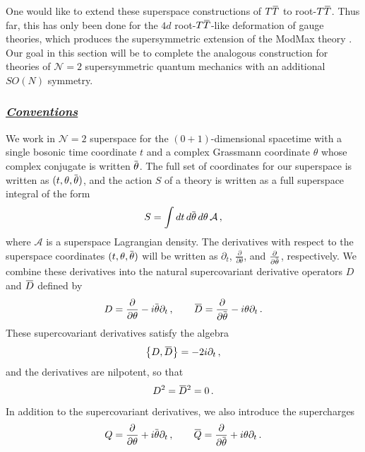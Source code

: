 \documentclass[12pt]{article}
\numberwithin{equation}{section}
\newcommand{\ul}{\underline}
\newcommand{\overbar}[1]{\mkern 1.5mu\overline{\mkern-1.5mu#1\mkern-1.5mu}\mkern 1.5mu}
\newcommand{\Dbar}{\overbar{D}}
\newcommand{\Qbar}{\overbar{Q}}
\newcommand{\thetab}{\overbar{\theta}}
\def\TT{{T\overbar{T}}}
\begin{document}
One would like to extend these superspace constructions of $\TT$ to root-$\TT$. Thus far, this has only been done for the $4d$ root-$\TT$-like deformation of gauge theories, which produces the supersymmetric extension of the ModMax theory \cite{Ferko:2023ruw}. Our goal in this section will be to complete the analogous construction for theories of $\mathcal{N} = 2$ supersymmetric quantum mechanics with an additional $SO(N)$ symmetry.

\subsubsection*{\ul{\it Conventions}}

We work in $\mathcal{N} = 2$ superspace for the $(0+1)$-dimensional spacetime with a single bosonic time coordinate $t$ and a complex Grassmann coordinate $\theta$ whose complex conjugate is written $\overbar{\theta}$. The full set of coordinates for our superspace is written as $(t , \theta , \overbar{\theta} )$, and the action $S$ of a theory is written as a full superspace integral of the form
%
\begin{align}
    S = \int dt \, d \thetab \, d \theta \, \mathcal{A} \, , 
\end{align}
%
where $\mathcal{A}$ is a superspace Lagrangian density. The derivatives with respect to the superspace coordinates $(t, \theta, \overbar{\theta})$ will be written as $\partial_t$, $\frac{\partial}{\partial \theta}$, and $\frac{\partial}{\partial \thetab}$, respectively. We combine these derivatives into the natural supercovariant derivative operators $D$ and $\Dbar$ defined by
%
\begin{align}
    D = \frac{\partial}{\partial \theta} - i \thetab \partial_t \, , \qquad \Dbar = \frac{\partial}{\partial \thetab} - i \theta \partial_t \, .
\end{align}
%
These supercovariant derivatives satisfy the algebra
%
\begin{align}\label{susy_algebra}
    \left\{ D , \Dbar \right\} = - 2 i \partial_t \, , 
\end{align}
%
and the derivatives are nilpotent, so that
%
\begin{align}
    D^2 = \Dbar^2 = 0 \, .
\end{align}
%
In addition to the supercovariant derivatives, we also introduce the supercharges
%
\begin{align}
    Q = \frac{\partial}{\partial \theta} + i \thetab \partial_t \, , \qquad \Qbar = \frac{\partial}{\partial \thetab} + i \theta \partial_t \, .
\end{align}
\end{document}
